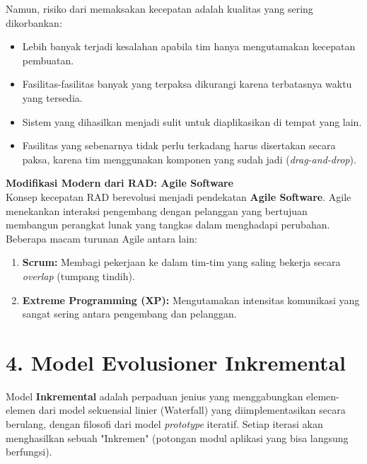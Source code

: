 \documentclass[12pt,a4paper]{article}
\begin{document}
Namun, risiko dari memaksakan kecepatan adalah kualitas yang sering dikorbankan:
\begin{itemize}
    \item Lebih banyak terjadi kesalahan apabila tim hanya mengutamakan kecepatan pembuatan.
    \item Fasilitas-fasilitas banyak yang terpaksa dikurangi karena terbatasnya waktu yang tersedia.
    \item Sistem yang dihasilkan menjadi sulit untuk diaplikasikan di tempat yang lain.
    \item Fasilitas yang sebenarnya tidak perlu terkadang harus disertakan secara paksa, karena tim menggunakan komponen yang sudah jadi (\textit{drag-and-drop}).
\end{itemize}

\begin{tipbox}
\textbf{Modifikasi Modern dari RAD: Agile Software} \\
Konsep kecepatan RAD berevolusi menjadi pendekatan \textbf{Agile Software}. Agile menekankan interaksi pengembang dengan pelanggan yang bertujuan membangun perangkat lunak yang tangkas dalam menghadapi perubahan. 
Beberapa macam turunan Agile antara lain:
\begin{enumerate}
    \item \textbf{Scrum:} Membagi pekerjaan ke dalam tim-tim yang saling bekerja secara \textit{overlap} (tumpang tindih).
    \item \textbf{Extreme Programming (XP):} Mengutamakan intensitas komunikasi yang sangat sering antara pengembang dan pelanggan.
\end{enumerate}
\end{tipbox}

\newpage
\section{4. Model Evolusioner Inkremental}

Model \textbf{Inkremental} adalah perpaduan jenius yang menggabungkan elemen-elemen dari model sekuensial linier (Waterfall) yang diimplementasikan secara berulang, dengan filosofi dari model \textit{prototype} iteratif.
Setiap iterasi akan menghasilkan sebuah "Inkremen" (potongan modul aplikasi yang bisa langsung berfungsi).
\end{document}
